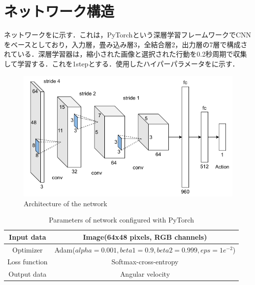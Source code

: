 
\section{ネットワーク構造}

  ネットワークをに示す．これは，PyTorch\cite{pytorch}という深層学習フレームワークでCNNをベースとしており，入力層，畳み込み層3，全結合層2，出力層の7層で構成されている．深層学習器は，縮小された画像と選択された行動を0.2秒周期で収集して学習する．これを1stepとする．使用したハイパーパラメータをに示す．

  \begin{figure}[h]
    \centering
    \includegraphics[keepaspectratio, scale=0.60] {images/RobotGuidance_network.png}
    \caption{Architecture of the network}
    \label{Fig:RobotGuidance_network}
  \end{figure}

  \begin{table}[hbtp]
    \caption{Parameters of network configured with PyTorch}
    \label{tab:Parameters of network configured with pytorch}
    \centering
    \begin{tabular}{|c|c|}
      \hline
      Input data & Image(64x48 pixels, RGB channels) \\
      \hline
      Optimizer & Adam($alpha = 0.001, beta1 = 0.9, beta2 =  0.999, eps = 1e^{-2}$)\\
      \hline
      Loss function & Softmax-cross-entropy\\
      \hline
      Output data & Angular velocity\\
      \hline
    \end{tabular}
  \end{table}

\newpage
